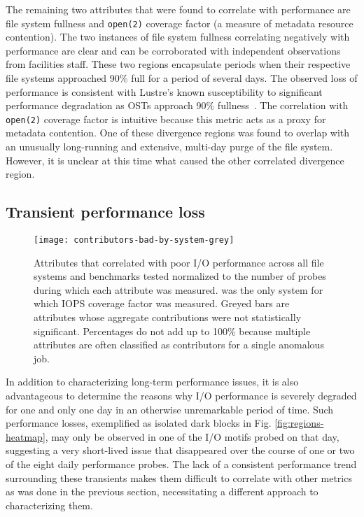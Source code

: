 The remaining two attributes that were found to correlate with performance
are file system fullness and \texttt{open(2)} coverage factor (a
measure of metadata resource contention).  The two instances of file
system fullness correlating negatively with performance are clear
and can be corroborated with independent observations from facilities
staff.  These two regions encapsulate periods when their respective
file systems approached 90\% full for a period of several days.
The observed loss of performance is consistent with Lustre's known
susceptibility to significant performance degradation as OSTs approach
90\% fullness~\cite{oral2014best,Lockwood2017}.  The correlation with
\texttt{open(2)} coverage factor is intuitive because this metric acts as a
proxy for metadata contention.  
One of these divergence regions was found to overlap with an unusually long-running and extensive, multi-day purge of the \edison \scratchtwo file system.
However, it is unclear at this time what caused the other correlated divergence region.


\subsection{Transient performance loss} \label{sec:results/shortterm}

\begin{figure}

    \centering
    \texttt{[image: contributors-bad-by-system-grey]}
    \vspace{-.35in}
    \caption{Attributes that correlated with poor I/O performance across all file systems and benchmarks tested normalized to the number of probes during which each attribute was measured.
    \mira was the only system for which IOPS coverage factor was measured.
    Greyed bars are attributes whose aggregate contributions were not statistically significant.
    Percentages do not add up to 100\% because multiple attributes are often classified as contributors for a single anomalous job.
    }
    \label{fig:contributors-bad-by-system}
\end{figure}

In addition to characterizing long-term performance issues, it is also advantageous to determine the reasons why I/O performance is severely degraded for one and only one day in an otherwise unremarkable period of time.
Such performance losses, exemplified as isolated dark blocks in Fig. \ref{fig:regions-heatmap}, may only be observed in one of the I/O motifs probed on that day, suggesting a very short-lived issue that disappeared over the course of one or two of the eight daily performance probes.
The lack of a consistent performance trend surrounding these transients makes them difficult to correlate with other metrics as was done in the previous section, necessitating a different approach to characterizing them.

